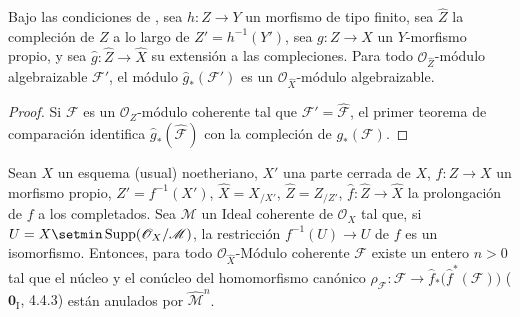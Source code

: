 \begin{lemma}[5.3.3]
\label{III.5.3.3}
\label{III.5.3.3-fr}
Bajo las condiciones de , sea $h:Z\to Y$ un
morfismo de tipo finito, sea $\widehat Z$ la compleción de $Z$
a lo largo de $Z'=h^{-1}(Y')$, sea $g:Z\to X$ un $Y$-morfismo propio,
y sea $\widehat g:\widehat Z\to\widehat X$ su extensión a
las compleciones. Para todo $\mathcal O_{\widehat Z}$-módulo
algebraizable $\mathcal F'$, el módulo
$\widehat g_*(\mathcal F')$ es un
$\mathcal O_{\widehat X}$-módulo algebraizable.
\end{lemma}

\begin{proof}
Si $\mathcal F$ es un $\mathcal O_Z$-módulo coherente tal que
$\mathcal F'=\widehat{\mathcal F}$, el primer teorema de comparación
 identifica
$\widehat g_*(\widehat{\mathcal F})$ con la compleción de
$g_*(\mathcal F)$.
\end{proof}

\begin{lemma}[5.3.4]
\label{III.5.3.4-fr}
Sean $X$ un esquema (usual) noetheriano, $X'$ una parte cerrada de $X$,
$f:Z\to X$ un morfismo propio, $Z'=f^{-1}(X')$,
$\widehat X=X_{/X'}$, $\widehat Z=Z_{/Z'}$,
$\widehat f:\widehat Z\to\widehat X$ la prolongación de $f$ a los completados. Sea
$\mathcal M$ un Ideal coherente de $\mathcal O_X$ tal que, si
$U=X\setmin\operatorname{Supp}(\mathcal O_X/\mathcal M)$, la restricción
$f^{-1}(U)\to U$ de $f$ es un isomorfismo. Entonces, para todo
$\mathcal O_{\widehat X}$-Módulo coherente $\mathcal F$ existe un entero $n>0$
tal que el núcleo y el conúcleo del homomorfismo canónico
$\rho_{\mathcal F}:\mathcal F\longrightarrow
\widehat f_*\bigl(\widehat f^{*}(\mathcal F)\bigr)$
\textup{($\mathbf{0}_{\mathrm I}$, 4.4.3)} están anulados por $\widehat{\mathcal M}^{n}$.
\end{lemma}

